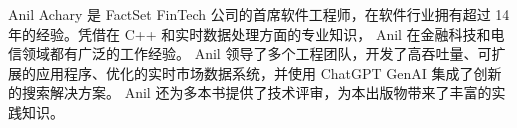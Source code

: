 Anil Achary 是 FactSet FinTech 公司的首席软件工程师，在软件行业拥有超过 14 年的经验。凭借在 C++ 和实时数据处理方面的专业知识， Anil 在金融科技和电信领域都有广泛的工作经验。 Anil 领导了多个工程团队，开发了高吞吐量、可扩展的应用程序、优化的实时市场数据系统，并使用 ChatGPT GenAI 集成了创新的搜索解决方案。 Anil 还为多本书提供了技术评审，为本出版物带来了丰富的实践知识。
